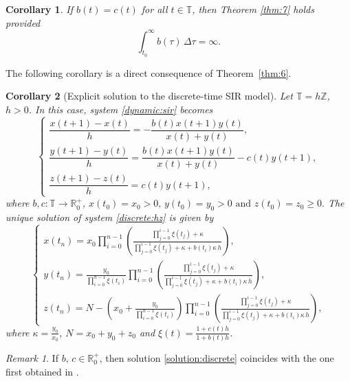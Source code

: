 \documentclass[pdflatex,sn-mathphys-num]{sn-jnl}
\newtheorem{corollary}{Corollary}
\theoremstyle{remark}
\newtheorem{remark}{Remark}
\begin{document}
\begin{corollary}
If $b(t) = c(t)$ for all $t \in \mathbb{T}$, then Theorem \ref{thm:7} holds 
provided
$$
\int_{t_0}^\infty b(\tau)\,\Delta\tau = \infty.
$$
\end{corollary}

The following corollary is a direct consequence of Theorem~\ref{thm:6}.

\begin{corollary}[Explicit solution to the discrete-time SIR model]	
Let $\mathbb{T} = h\mathbb{Z}$, $h > 0$. 
In this case, system \eqref{dynamic:sir} becomes
\begin{equation}
\label{discrete:hz}
\begin{cases}
\dfrac{x(t+1) - x(t)}{h} = -\dfrac{b(t)x(t+1)y(t)}{x(t) + y(t)},\\
\dfrac{y(t+1) - y(t)}{h} = \dfrac{b(t)x(t+1)y(t)}{x(t) + y(t)} - c(t)y(t+1),\\
\dfrac{z(t+1) - z(t)}{h} = c(t)y(t+1),
\end{cases}
\end{equation}
where $b, c : \mathbb{T} \rightarrow \mathbb{R}_0^+$, $x(t_0) = x_0 > 0,\, 
y(t_0) = y_0 > 0\,\, \text{and} \,\, z(t_0) = z_0 \geq 0.$
The unique solution of system \eqref{discrete:hz} is given by
\begin{equation}
\label{solution:discrete}
\begin{cases}
x(t_n) = x_0 \displaystyle \prod_{i = 0}^{n-1} \left(\frac{\prod_{j=0}^{i-1} 
\xi(t_j) + \kappa}{\prod_{j=0}^{i-1} \xi(t_j) + \kappa + b(t_i)\kappa\,h}
\right),\\
y(t_n) = \frac{y_0}{\prod_{i = 0}^{n-1} \xi(t_i)} \displaystyle 
\prod_{i = 0}^{n-1} \left(\frac{\prod_{j=0}^{i-1} \xi(t_j) + \kappa}
{\prod_{j=0}^{i-1} \xi(t_j) + \kappa + b(t_i)\kappa\,h}\right),\\
z(t_n) = N - \left(x_0 + \frac{y_0}{\prod_{i = 0}^{n-1} \xi(t_i)}\right)
\displaystyle \prod_{i = 0}^{n-1} \left(\frac{\prod_{j=0}^{i-1} \xi(t_j) + \kappa}
{\prod_{j=0}^{i-1} \xi(t_j) + \kappa + b(t_i)\kappa\,h}\right),
\end{cases}
\end{equation}
where $\kappa = \frac{y_0}{x_0}$, $N = x_0 + y_0 + z_0$ and 
$\xi(t) = \frac{1 + c(t)h}{1 + b(t)h}$.
\end{corollary}

\begin{remark}
If $b,\, c \in \mathbb{R}^+_0$, then solution \eqref{solution:discrete} 
coincides with the one first obtained in \cite{sir:discrete}.
\end{remark}
\end{document}
